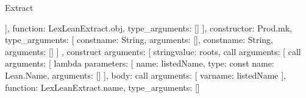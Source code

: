\begin{lexlean}{Extract}
\begin{toolingmodule}
{{{{{{{{{{{{{{{{{{{                                                            ],
                                                            function: LexLeanExtract.obj,
                                                            type_arguments: []
                                                          }
                                                        ],
                                                        constructor: Prod.mk,
                                                        type_arguments: [
                                                          const{name: String, arguments: []},
                                                          const{name: String, arguments: []}
                                                        ]
                                                      },
                                                      construct{
                                                        arguments: [
                                                          string{value: roots},
                                                          call{
                                                            arguments: [
                                                              call{
                                                                arguments: [
                                                                  lambda{
                                                                    parameters: [
                                                                      {
                                                                        name: listedName,
                                                                        type: const{
                                                                          name: Lean.Name,
                                                                          arguments: []
                                                                        }
                                                                      }
                                                                    ],
                                                                    body: call{
                                                                      arguments: [
                                                                        var{name: listedName}
                                                                      ],
                                                                      function: LexLeanExtract.name,
                                                                      type_arguments: []
}}}}}}}}}}}}}}}}}}}}}}
\end{toolingmodule}
\end{lexlean}
